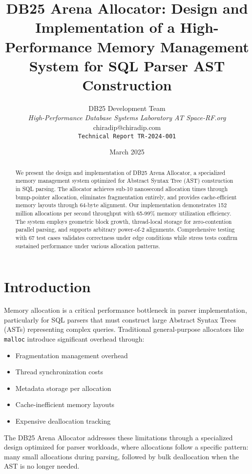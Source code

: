 \documentclass[11pt,a4paper]{article}
\title{\textbf{DB25 Arena Allocator: Design and Implementation of a High-Performance Memory Management System for SQL Parser AST Construction}}
\author{
    DB25 Development Team\\
    \textit{High-Performance Database Systems Laboratory AT Space-RF.org}\\
    chiradip@chiradip.com \\
    \texttt{Technical Report TR-2024-001}
}
\date{March 2025}
\begin{document}
\maketitle

\begin{abstract}
We present the design and implementation of DB25 Arena Allocator, a specialized memory management system optimized for Abstract Syntax Tree (AST) construction in SQL parsing. The allocator achieves sub-10 nanosecond allocation times through bump-pointer allocation, eliminates fragmentation entirely, and provides cache-efficient memory layouts through 64-byte alignment. Our implementation demonstrates 152 million allocations per second throughput with 65-99\% memory utilization efficiency. The system employs geometric block growth, thread-local storage for zero-contention parallel parsing, and supports arbitrary power-of-2 alignments. Comprehensive testing with 67 test cases validates correctness under edge conditions while stress tests confirm sustained performance under various allocation patterns.
\end{abstract}

\section{Introduction}

Memory allocation is a critical performance bottleneck in parser implementation, particularly for SQL parsers that must construct large Abstract Syntax Trees (ASTs) representing complex queries. Traditional general-purpose allocators like \texttt{malloc} introduce significant overhead through:

\begin{itemize}
    \item Fragmentation management overhead
    \item Thread synchronization costs
    \item Metadata storage per allocation
    \item Cache-inefficient memory layouts
    \item Expensive deallocation tracking
\end{itemize}

The DB25 Arena Allocator addresses these limitations through a specialized design optimized for parser workloads, where allocations follow a specific pattern: many small allocations during parsing, followed by bulk deallocation when the AST is no longer needed.
\end{document}
